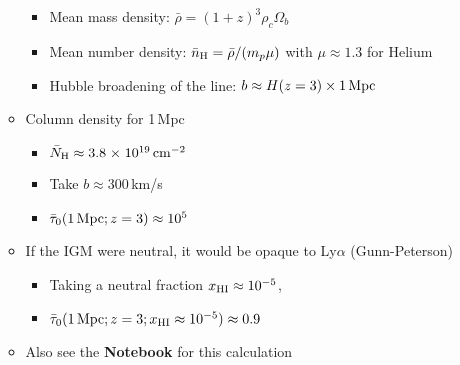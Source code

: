 \documentclass[12pt,letterpaper]{article}
\begin{document}
\begin{Aenumerate}
\begin{itemize}
\begin{itemize}
			\begin{itemize}
			\item Mean mass density: $\bar \rho = (1+z)^3 \rho_c \Omega_b$
			\item Mean number density: $\bar n_{\rm H}  = \bar\rho / (m_p \mu)$
			with $\mu \approx 1.3$ for Helium
			\item Hubble broadening of the line: $b \approx H(z=3) \times 1\,{\rm Mpc}$
			\end{itemize}
		\item Column density for 1\,Mpc
			\begin{itemize}
			\item $\bar N_{\rm H} \approx 3.8{\; \times \; 10^{19}} \, {\rm cm^{-2}}$
			\item Take $b \approx 300$\,km/s
			\item $\bar \tau_0(1\,{\rm Mpc}; z=3) \approx 10^5$
			\end{itemize}
		\item If the IGM were neutral, it would be opaque to Ly$\alpha$ (Gunn-Peterson)
			\begin{itemize}
			\item Taking a neutral fraction $x_{\rm HI} \approx 10^{-5}$,
			\item $\bar \tau_0(1\,{\rm Mpc}; z=3; x_{\rm HI}\approx 10^{-5}) 
			\approx 0.9$
			\end{itemize}
		\item Also see the {\bf Notebook} for this calculation
		\end{itemize}

	\end{itemize}


\end{Aenumerate}
\end{document}
